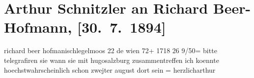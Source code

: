 

         
         \renewcommand{\erwaehntePersonen}{Personen: Richard Beer-Hofmann, Hermann Freinthaller, Hugo von Hofmannsthal}
         \renewcommand{\erwaehnteOrte}{Orte: Bad Ischl, Eglmoosgasse, Salzburg, Wien}
         \renewcommand{\erwaehnteWerke}{}
               \section[Arthur Schnitzler an Richard Beer-Hofmann, {[}30. 7. 1894{]}]{ Arthur Schnitzler an Richard Beer-Hofmann, {[}30. 7. 1894{]}}\nopagebreak{}\rehead{ }\begin{ledgroupsized}[t]{13cm}\normalsize\beginnumbering \toendnotes[C]{\smallbreak\pagebreak[2]} 
\pstart{}{\pb}richard beer hofman\pend{}\pstart{}ischlegelmoos 22\pend{}{\bigskip}\pstart
           \noindent{}{\pb}de wien 72+ 1718
               26 9/50= \pend
           \pstart
           bitte telegrafiren sie wann sie mit hugosalzburg zusammentreffen ich koennte
               hoechstwahrscheinlich schon zwejter august dort sein\pend
           \pstart = herzlich\spacefill\mbox{arthur}\pend{}
         
         \endnumbering{}\end{ledgroupsized}  \newcommand{\dateiname}{L00359}\newcommand{\titel}{Arthur Schnitzler an Richard Beer-Hofmann, [30. 7. 1894]}\newcommand{\editorInnen}{Martin Anton Müller und Gerd-Hermann Susen}
      